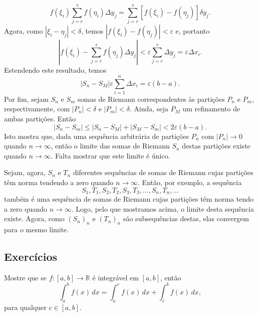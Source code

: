\begin{dem}
\begin{equation}
  f(\xi_i)\sum_{j=r}^s f(\eta_i)\Delta y_j = \sum_{j=r}^s [f(\xi_i) - f(\eta_j)]\delta y_j.
\end{equation}
Agora, como $|\xi_i-\eta_j|<\delta$, temos $|f(\xi_i) - f(\eta_j)|<\varepsilon$ e, portanto
\begin{equation}
  \left|f(\xi_i) - \sum_{j=r}^s f(\eta_j)\Delta y_j\right| < \varepsilon \sum_{j=r}^s \Delta y_j = \varepsilon\Delta x_i.
\end{equation}
Estendendo este resultado, temos
\begin{equation}
  |S_n - S_M| \varepsilon\sum_{i=1}^n \Delta x_i = \varepsilon (b-a).
\end{equation}
Por fim, sejam $S_n$ e $S_m$ somas de Riemann correspondentes às partições $P_n$ e $P_m$, respectivamente, com $|P_n|<\delta$ e $|P_m|<\delta$. Ainda, seja $P_M$ um refinamento de ambas partições. Então
\begin{equation}
  |S_n - S_m| \leq |S_n - S_M| + |S_M - S_m| < 2\varepsilon (b-a).
\end{equation}
Isto mostra que, dada uma sequência arbitrária de partições $P_n$ com $|P_n|\to 0$ quando $n\to \infty$, então o limite das somas de Riemann $S_n$ destas partições existe quando $n\to\infty$. Falta mostrar que este limite é único.

Sejam, agora, $S_n$ e $T_n$ diferentes sequências de somas de Riemann cujas partições têm norma tendendo a zero quando $n\to\infty$. Então, por exemplo, a sequência
\begin{equation}
  S_1, T_1, S_2, T_2, S_3, T_3, \dotsc, S_n, T_n, \ldots
\end{equation}
também é uma sequência de somas de Riemann cujas partições têm norma tendo a zero quando $n\to\infty$. Logo, pelo que mostramos acima, o limite desta sequência existe. Agora, como $(S_n)_n$ e $(T_n)_n$ são subsequências destas, elas convergem para o mesmo limite.
\end{dem}

\subsection*{Exercícios}

\begin{exer}
  Mostre que se $f:[a, b]\to\mathbb{R}$ é integrável em $[a, b]$, então
  \begin{equation}
    \int_a^b f(x)\,dx = \int_a^c f(x)\,dx + \int_c^b f(x)\,dx,
  \end{equation}
para qualquer $c\in [a, b]$.
\end{exer}